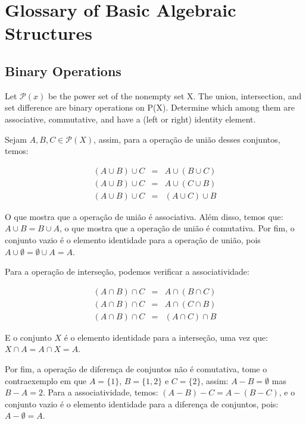 \chapter{Glossary of Basic Algebraic Structures}

\section{Binary Operations}

\begin{exercicio}{1.17}
	Let \(\mathcal{P}(x)\) be the power set of the nonempty set X. The union, intersection,
	and set difference are binary operations on P(X). Determine which among them
	are associative, commutative, and have a (left or right) identity element.
\end{exercicio}


\begin{solucao}
Sejam \(A, B, C \in \mathcal{P}(X)\), assim, para a operação de união desses conjuntos, temos:

\[
\begin{array}{rcl}
	(A \cup B) \cup C & = & A \cup (B \cup C) \\
	(A \cup B) \cup C & = & A \cup (C \cup B) \\
	(A \cup B) \cup C & = & (A \cup C) \cup B
\end{array}
\]

O que mostra que a operação de união é associativa. Além disso, temos que: \(A \cup B = B \cup A\), o que mostra que a operação de união é comutativa. Por fim, o conjunto vazio é o elemento identidade para a operação de união, pois \(A \cup \emptyset = \emptyset \cup A = A\).

Para a operação de interseção, podemos verificar a associatividade:

\[
\begin{array}{rcl}
	(A \cap B) \cap C & = & A \cap (B \cap C) \\
	(A \cap B) \cap C & = & A \cap (C \cap B) \\
	(A \cap B) \cap C & = & (A \cap C) \cap B
\end{array}
\]

E o conjunto $X$ é o elemento identidade para a interseção, uma vez que: \(X \cap A = A \cap X = A\).

Por fim, a operação de diferença de conjuntos não é comutativa, tome o contraexemplo em que \(A = \{1\}\), \(B = \{1, 2\}\) e \(C = \{2\}\), assim: \(A - B = \emptyset\) mas \(B - A = {2}\). Para a associatividade, temos: \((A - B) - C = A - (B - C)\), e o conjunto vazio é o elemento identidade para a diferença de conjuntos, pois: \(A - \emptyset = A\).
\end{solucao}

